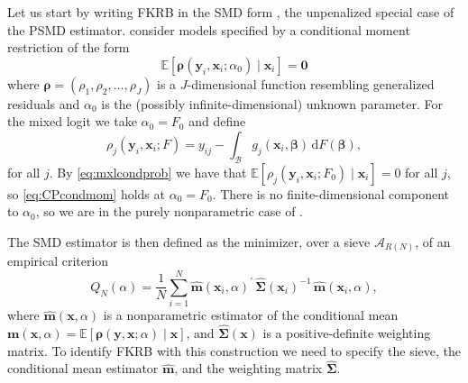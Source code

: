 Let us start by writing FKRB in the SMD form \citep[see][]{AiChen2003}, the unpenalized special case of the PSMD estimator.
\citet{ChenPouzo2015} consider models specified by a conditional moment restriction of the form
\begin{equation}
\label{eq:CPcondmom}
    \mathbb{E}[\bm{\rho}(\bm{y}_i, \bm{x}_i; \alpha_0) \mid \bm{x}_i] = \bm{0}
\end{equation}
where $\bm{\rho} = (\rho_1,\rho_2,\ldots,\rho_J)$ is a $J$-dimensional function resembling generalized residuals and $\alpha_0$ is the (possibly infinite-dimensional) unknown parameter.
For the mixed logit we take $\alpha_0 = F_0$ and define
\begin{equation}
\label{eq:rhoMXL}
    \rho_j(\bm{y}_i, \bm{x}_i; F) = y_{ij} - \int_{\mathcal{B}} g_j(\bm{x}_i, \bm{\beta}) \, \mathrm{d}F(\bm{\beta}),
\end{equation}
for all $j$. By \cref{eq:mxlcondprob} we have that $\mathbb{E}[\rho_j(\bm{y}_i,\bm{x}_i; F_0) \mid \bm{x}_i] = 0$ for all $j$, so \cref{eq:CPcondmom} holds at $\alpha_0 = F_0$.
There is no finite-dimensional component to $\alpha_0$, so we are in the purely nonparametric case of \citet{ChenPouzo2015}.

The SMD estimator is then defined as the minimizer, over a sieve $\mathcal{A}_{R(N)}$, of an empirical criterion
\begin{equation}
\label{eq:SMDcrit}
    Q_N(\alpha) = \frac{1}{N}\sum_{i=1}^N \hat{\bm{m}}(\bm{x}_i, \alpha)^\prime\, \hat{\bm{\Sigma}}(\bm{x}_i)^{-1}\, \hat{\bm{m}}(\bm{x}_i, \alpha),
\end{equation}
where $\hat{\bm{m}}(\bm{x}, \alpha)$ is a nonparametric estimator of the conditional mean $\bm{m}(\bm{x}, \alpha) = \mathbb{E}[\bm{\rho}(\bm{y}, \bm{x}; \alpha) \mid \bm{x}]$, and $\hat{\bm{\Sigma}}(\bm{x})$ is a positive-definite weighting matrix.
To identify FKRB with this construction we need to specify the sieve, the conditional mean estimator $\hat{\bm{m}}$, and the weighting matrix $\hat{\bm{\Sigma}}$.

